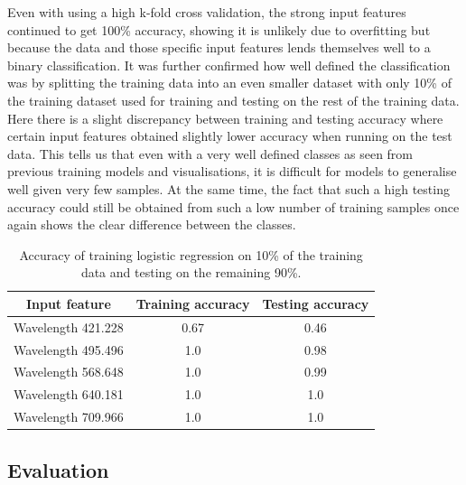 \documentclass{article}
\begin{document}
\noindent
Even with using a high k-fold cross validation, the strong input features continued to get 100\% accuracy, showing it is unlikely due to overfitting but because the data and those specific input features lends themselves well to a binary classification. It was further confirmed how well defined the classification was by splitting the training data into an even smaller dataset with only 10\% of the training dataset used for training and testing on the rest of the training data. Here there is a slight discrepancy between  training and testing accuracy where certain input features obtained slightly lower accuracy when running on the test data. This tells us that even with a very well defined classes as seen from previous training models and visualisations, it is difficult for models to generalise well given very few samples. At the same time, the fact that such a high testing accuracy could still be obtained from such a low number of training samples once again shows the clear difference between the classes.

\begin{table}[H]
\centering
\begin{tabular}{| c | c | c |}
\hline
\textbf{Input feature} & \textbf{Training accuracy} & \textbf{Testing accuracy}\\
\hline
Wavelength 421.228 & 0.67 & 0.46\\
\hline
Wavelength 495.496 & 1.0 & 0.98\\
\hline
Wavelength 568.648 & 1.0 & 0.99\\
\hline
Wavelength 640.181 & 1.0 & 1.0\\
\hline
Wavelength 709.966 & 1.0 & 1.0\\
\hline
\end{tabular}
\caption{Accuracy of training logistic regression on 10\% of the training data and testing on the remaining 90\%.}
\end{table}
\noindent


\subsection{Evaluation}
\end{document}
